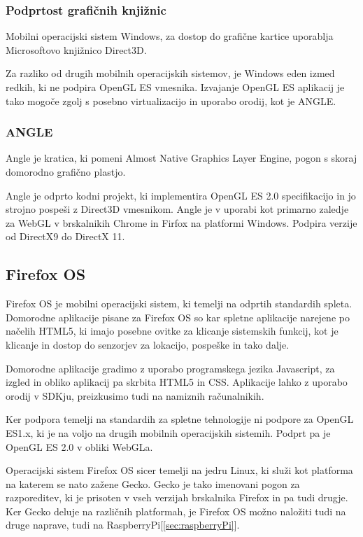 \subsubsection{Podprtost grafičnih knjižnic}

Mobilni operacijski sistem Windows, za dostop do grafične kartice uporablja Microsoftovo knjižnico Direct3D. %

Za razliko od drugih mobilnih operacijskih sistemov, je Windows eden izmed redkih, ki ne podpira OpenGL ES vmesnika. Izvajanje OpenGL ES aplikacij je tako mogoče zgolj s posebno virtualizacijo in uporabo orodij, kot je ANGLE.

\subsubsection{ANGLE}
Angle \cite{angle} je kratica, ki pomeni Almost Native Graphics Layer Engine, pogon s skoraj domorodno grafično plastjo.

Angle je odprto kodni projekt, ki implementira OpenGL ES 2.0 specifikacijo in jo strojno pospeši z Direct3D vmesnikom. Angle je v uporabi kot primarno zaledje za WebGL v brskalnikih Chrome in Firfox na platformi Windows. Podpira verzije od DirectX9 do DirectX 11.  

\subsection{Firefox OS}

Firefox OS \cite{firefoxos} je mobilni operacijski sistem, ki temelji na odprtih standardih spleta. Domorodne aplikacije pisane za Firefox OS so kar spletne aplikacije narejene po načelih HTML5, ki imajo posebne ovitke za klicanje sistemskih funkcij, kot je klicanje in dostop do senzorjev za lokacijo, pospeške in tako dalje.

Domorodne aplikacije gradimo z uporabo programskega jezika Javascript, za izgled in obliko aplikacij pa skrbita HTML5 in CSS. Aplikacije lahko z uporabo orodij v SDKju, preizkusimo tudi na namiznih računalnikih.

Ker podpora temelji na standardih za spletne tehnologije ni podpore za OpenGL ES1.x, ki je na voljo na drugih mobilnih operacijskih sistemih. Podprt pa je OpenGL ES 2.0 v obliki WebGLa.

Operacijski sistem Firefox OS sicer temelji na jedru Linux, ki služi kot platforma na katerem se nato zažene Gecko. Gecko je tako imenovani pogon za razporeditev, ki je prisoten v vseh verzijah brskalnika Firefox in pa tudi drugje. Ker Gecko deluje na različnih platformah, je Firefox OS možno naložiti tudi na druge naprave, tudi na RaspberryPi[\ref{sec:raspberryPi}]. 

